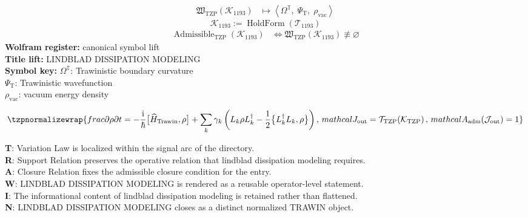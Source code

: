 \noindent
\begin{minipage}[t]{0.48\linewidth}
\begingroup
\small
\[
\begin{aligned}
\mathfrak{W}_{\mathrm{TZP}}\!\left(\mathcal{K}_{1193}\right)
&\longmapsto
\left\langle \Omega^{\mathbb{T}},\; \Psi_{\mathrm{T}},\; \rho_{\mathrm{vac}} \right\rangle
\end{aligned}
\]
\[
\mathcal{K}_{1193}
:=
\operatorname{HoldForm}\!\left(\mathcal{T}_{1193}\right)
\]
\[
\begin{aligned}
\operatorname{Admissible}_{\mathrm{TZP}}\!\left(\mathcal{K}_{1193}\right)
&\Longleftrightarrow
\mathfrak{W}_{\mathrm{TZP}}\!\left(\mathcal{K}_{1193}\right)\not\equiv\varnothing
\end{aligned}
\]
\textbf{Wolfram register:} canonical symbol lift\\
\textbf{Title lift:} LINDBLAD DISSIPATION MODELING\\
\textbf{Symbol key:} \(\Omega^{\mathbb{T}}\): Trawinistic boundary curvature\\ \(\Psi_{\mathrm{T}}\): Trawinistic wavefunction\\ \(\rho_{\mathrm{vac}}\): vacuum energy density
\par
\endgroup
\end{minipage}\hfill
\begin{minipage}[t]{0.48\linewidth}
\[
\tzpnormalizewrap{frac{\partial \rho}{\partial t} = - \frac{\mathrm{i}}{\hbar} \bigl[ \widehat{H}_{\mathrm{Trawin}}, \rho \bigr] + \sum_{k} \gamma_{k} \left( L_{k} \rho L_{k}^{\dagger} - \frac{1}{2} \bigl\{ L_{k}^{\dagger} L_{k}, \rho \bigr\} \right),\,mathcal{J}_{\mathrm{out}} = \mathcal{T}_{\mathrm{TZP}}\!\left(\mathcal{K}_{\mathrm{TZP}}\right),\,mathcal{A}_{\mathrm{adm}}\!\left(\mathcal{J}_{\mathrm{out}}\right)=1}
\]

\small
\textbf{T}: Variation Law is localized within the signal arc of the directory.\\
\textbf{R}: Support Relation preserves the operative relation that lindblad dissipation modeling requires.\\
\textbf{A}: Closure Relation fixes the admissible closure condition for the entry.\\
\textbf{W}: LINDBLAD DISSIPATION MODELING is rendered as a reusable operator-level statement.\\
\textbf{I}: The informational content of lindblad dissipation modeling is retained rather than flattened.\\
\textbf{N}: LINDBLAD DISSIPATION MODELING closes as a distinct normalized TRAWIN object.
\normalsize
\end{minipage}

